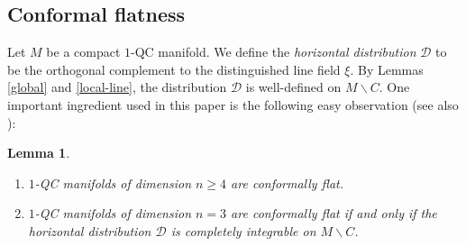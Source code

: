 \documentclass[JEP,XML,SOM,Unicode]{cedram}
\let\mathcal\mathscr
\let\moins\smallsetminus
\newtheorem{lemma}[theorem]{Lemma}
\theoremstyle{definition}
\theoremstyle{remark}
\numberwithin{equation}{section}
\begin{document}
\subsection{Conformal flatness}\label{section-conformal}
Let $M$ be a compact $1$-QC manifold. We define the \emph{horizontal distribution} $\mathcal D$ to be the
orthogonal complement to the distinguished line field $\xi$. By Lemmas \ref{global} and \ref{local-line}, the distribution
$\mathcal D$ is well-defined on $M\moins C$.
One important ingredient used in this paper is the
following easy observation (see also \cite{BF,GM}):

\skpt
\begin{lemma}\label{conformal}
\begin{enumerate}
\item
$1$-QC manifolds of dimension $n\geq4$ are conformally flat.
\item $1$-QC manifolds of dimension $n=3$ are conformally flat if and only if
the horizontal distribution $\mathcal D$ is completely integrable on $M\moins C$.
\end{enumerate}
\end{lemma}
\end{document}
